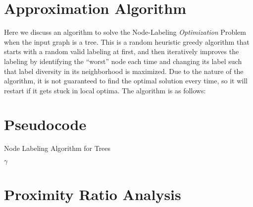 \documentclass{article}
\begin{document}
\section{Approximation Algorithm}

Here we discuss an algorithm to solve the Node-Labeling \textit{Optimization} Problem when the input graph is a tree.
This is a random heuristic greedy algorithm that starts with a random valid labeling at first, and then iteratively improves the labeling by identifying the ``worst'' node each time and changing its label such that label diversity in its neighborhood is maximized.
Due to the nature of the algorithm, it is not guaranteed to find the optimal solution every time, so it will restart if it gets stuck in local optima.
The algorithm is as follows:

\section{Pseudocode}

\begin{algorithm}[H]
    \caption{Node Labeling Algorithm for Trees}
    \BlankLine
    \Return $\gamma$\;
\end{algorithm}

\section{Proximity Ratio Analysis}
\end{document}
